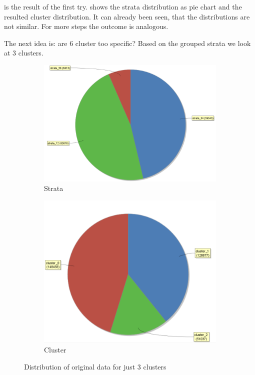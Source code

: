  is the result of the first try.  shows the strata distribution as pie chart and  the resulted cluster distribution. It can already been seen, that the distributions are not similar. For more steps the outcome is analogous.

The next idea is: are 6 cluster too specific? Based on the grouped strata we look at 3 clusters.

\begin{figure}[H]
\centering
\begin{subfigure}{.4\textwidth}
  \centering
  \includegraphics[width=.8\linewidth]{ClusterOrigRapidStrata2Cluster.PNG}
  \caption{Strata}
  \label{fig:OrgSt3}
\end{subfigure}%
\begin{subfigure}{.35\textwidth}
  \centering
  \includegraphics[width=.8\linewidth]{ClusterOrigRapidCluster2Cluster.PNG}
  \caption{Cluster}
  \label{fig:OrgCl3}
\end{subfigure}
\caption{Distribution of original data for just 3 clusters}
\label{fig:OrgDist3Cl}
\end{figure}

